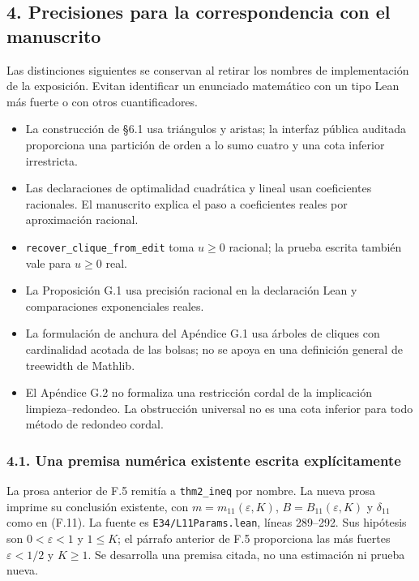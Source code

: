 \documentclass[spanish,11pt,a4paper]{article}
\providecommand{\tightlist}{\setlength{\itemsep}{0pt}\setlength{\parskip}{0pt}}
\begin{document}
\subsection{4. Precisiones para la correspondencia con el
manuscrito}\label{precisiones-para-la-correspondencia-con-el-manuscrito}

Las distinciones siguientes se conservan al retirar los nombres de
implementación de la exposición. Evitan identificar un enunciado
matemático con un tipo Lean más fuerte o con otros cuantificadores.

\begin{itemize}
\tightlist
\item
  La construcción de §6.1 usa triángulos y aristas; la interfaz pública
  auditada proporciona una partición de orden a lo sumo cuatro y una
  cota inferior irrestricta.
\item
  Las declaraciones de optimalidad cuadrática y lineal usan coeficientes
  racionales. El manuscrito explica el paso a coeficientes reales por
  aproximación racional.
\item
  \nolinkurl{recover_clique_from_edit} toma \(u\ge0\) racional; la
  prueba escrita también vale para \(u\ge0\) real.
\item
  La Proposición G.1 usa precisión racional en la declaración Lean y
  comparaciones exponenciales reales.
\item
  La formulación de anchura del Apéndice G.1 usa árboles de cliques con
  cardinalidad acotada de las bolsas; no se apoya en una definición
  general de treewidth de Mathlib.
\item
  El Apéndice G.2 no formaliza una restricción cordal de la implicación
  limpieza--redondeo. La obstrucción universal no es una cota inferior
  para todo método de redondeo cordal.
\end{itemize}

\subsubsection{4.1. Una premisa numérica existente escrita
explícitamente}\label{una-premisa-numuxe9rica-existente-escrita-expluxedcitamente}

La prosa anterior de F.5 remitía a \nolinkurl{thm2_ineq} por nombre. La
nueva prosa imprime su conclusión existente, con
\(m=m_{11}(\varepsilon,K)\), \(B=B_{11}(\varepsilon,K)\) y
\(\delta_{11}\) como en (F.11). La fuente es
\nolinkurl{E34/L11Params.lean}, líneas 289--292. Sus hipótesis son
\(0<\varepsilon<1\) y \(1\le K\); el párrafo anterior de F.5 proporciona
las más fuertes \(\varepsilon<1/2\) y \(K\ge1\). Se desarrolla una
premisa citada, no una estimación ni prueba nueva.
\end{document}
